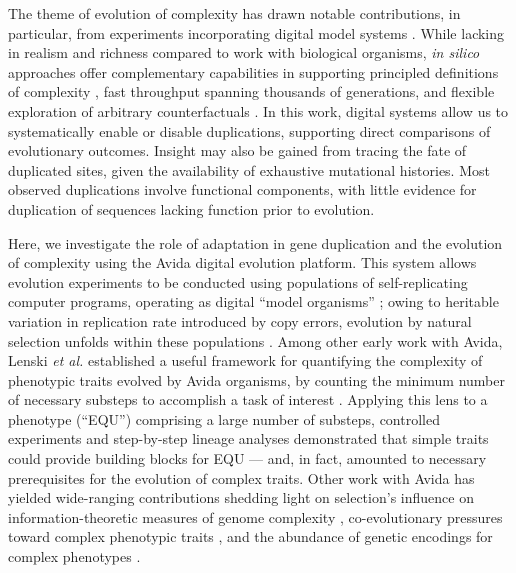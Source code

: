 The theme of evolution of complexity has drawn notable contributions, in particular, from experiments incorporating digital model systems \citep{Fortuna2022}.
While lacking in realism and richness compared to work with biological organisms, \textit{in silico} approaches offer complementary capabilities in supporting principled definitions of complexity \citep{Adami2002}, fast throughput spanning thousands of generations, and flexible exploration of arbitrary counterfactuals \citep{langton1989artificial}.
In this work, digital systems allow us to systematically enable or disable duplications, supporting direct comparisons of evolutionary outcomes.
Insight may also be gained from tracing the fate of duplicated sites, given the availability of exhaustive mutational histories.
Most observed duplications involve functional components, with little evidence for duplication of sequences lacking function prior to evolution.



Here, we investigate the role of adaptation in gene duplication and the evolution of complexity using the Avida digital evolution platform.
This system allows evolution experiments to be conducted using populations of self-replicating computer programs, operating as digital ``model organisms'' \citep{Ofria:2009avida};
owing to heritable variation in replication rate introduced by copy errors, evolution by natural selection unfolds within these populations \citep{pennock2007models}.
Among other early work with Avida, Lenski \textit{et al.} established a useful framework for quantifying the complexity of phenotypic traits evolved by Avida organisms, by counting the minimum number of necessary substeps to accomplish a task of interest \citet{Lenski2003Evolutionary}.
Applying this lens to a phenotype  (``EQU'') comprising a large number of substeps, controlled experiments and step-by-step lineage analyses demonstrated that simple traits could provide building blocks for EQU --- and, in fact, amounted to necessary prerequisites for the evolution of complex traits.
Other work with Avida has yielded wide-ranging contributions shedding light on selection's influence on information-theoretic measures of genome complexity \citep{Adami2000Evolution}, co-evolutionary pressures toward complex phenotypic traits \citep{Zaman2014Coevolution}, and the abundance of genetic encodings for complex phenotypes \citep{Fortuna2017GenotypePhenotype}.

